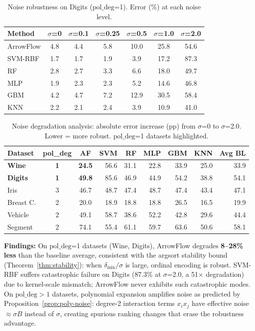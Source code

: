 \documentclass[12pt]{article}
\begin{document}
\begin{table}[ht]
\centering
\caption{Noise robustness on Digits ($\mathrm{pol\_deg}$=1). Error (\%) at each noise level.}
\label{tab:noise-digits}
\small
\begin{tabular}{lcccccc}
\toprule
Method & $\sigma$=0 & $\sigma$=0.1 & $\sigma$=0.25 & $\sigma$=0.5 & $\sigma$=1.0 & $\sigma$=2.0 \\
\midrule
ArrowFlow   & 4.8  & 4.4  & 5.8  & 10.0 & 25.8 & 54.6 \\
SVM-RBF     & 1.7  & 1.7  & 1.9  & 3.9  & 17.2 & 87.3 \\
RF          & 2.8  & 2.7  & 3.3  & 6.6  & 18.0 & 49.7 \\
MLP         & 1.9  & 2.3  & 2.3  & 5.2  & 14.6 & 46.8 \\
GBM     & 4.2  & 4.7  & 7.2  & 12.9 & 30.5 & 58.4 \\
KNN         & 2.2  & 2.1  & 2.4  & 3.9  & 10.9 & 41.0 \\
\bottomrule
\end{tabular}
\end{table}

\begin{table}[ht]
\centering
\caption{Noise degradation analysis: absolute error increase (pp) from $\sigma$=0 to $\sigma$=2.0. Lower = more robust. $\mathrm{pol\_deg}$=1 datasets highlighted.}
\label{tab:noise-degrad}
\small
\begin{tabular}{lccrrrrrr}
\toprule
Dataset & pol\_deg & AF & SVM & RF & MLP & GBM & KNN & Avg BL \\
\midrule
\textbf{Wine} & \textbf{1} & \textbf{24.5} & 56.6 & 31.1 & 22.8 & 33.9 & 25.0 & 33.9 \\
\textbf{Digits} & \textbf{1} & \textbf{49.8} & 85.6 & 46.9 & 44.9 & 54.2 & 38.8 & 54.1 \\
Iris & 3 & 46.7 & 48.7 & 47.4 & 48.7 & 47.4 & 43.4 & 47.1 \\
Breast C. & 2 & 20.0 & 18.9 & 18.8 & 18.8 & 26.5 & 16.5 & 19.9 \\
Vehicle & 2 & 49.1 & 58.7 & 38.6 & 52.2 & 42.8 & 29.6 & 44.4 \\
Segment & 2 & 74.1 & 55.4 & 61.1 & 59.7 & 63.6 & 50.6 & 58.1 \\
\bottomrule
\end{tabular}
\end{table}

\textbf{Findings:} On $\mathrm{pol\_deg}$=1 datasets (Wine, Digits), ArrowFlow degrades \textbf{8--28\% less} than the baseline average, consistent with the argsort stability bound (Theorem~\ref{thm:stability}): when $\delta_{\min}/\sigma$ is large, ordinal encoding is robust. SVM-RBF suffers catastrophic failure on Digits (87.3\% at $\sigma$=2.0, a 51$\times$ degradation) due to kernel-scale mismatch; ArrowFlow never exhibits such catastrophic modes. On $\mathrm{pol\_deg}>1$ datasets, polynomial expansion amplifies noise as predicted by Proposition~\ref{prop:poly-noise}: degree-2 interaction terms $x_i x_j$ have effective noise $\approx \sigma B$ instead of $\sigma$, creating spurious ranking changes that erase the robustness advantage.
\end{document}
